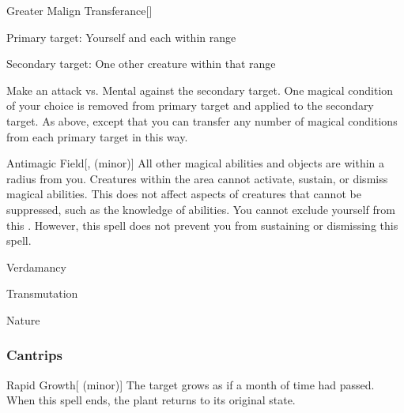 \lowercase{\hypertarget{spell:Greater Malign Transferance}{}}\label{spell:Greater Malign Transferance}
\begin{freeability}[Rank 6]{\hypertarget{spell:Greater Malign Transferance}{Greater Malign Transferance}}[]

Primary target: Yourself and each  within \rngmed range
\par\noindent
Secondary target: One other creature within that range

Make an attack vs. Mental against the secondary target.
\hit One magical condition of your choice is removed from primary target and applied to the secondary target.
\crit As above, except that you can transfer any number of magical conditions from each primary target in this way.
\end{freeability}
\vspace{0.25em}



\lowercase{\hypertarget{spell:Antimagic Field}{}}\label{spell:Antimagic Field}
\begin{freeability}[Rank 8]{\hypertarget{spell:Antimagic Field}{Antimagic Field}}[,  (minor)]
All other magical abilities and objects are  within a \areamed radius  from you.
Creatures within the area cannot activate, sustain, or dismiss magical abilities.
This does not affect aspects of creatures that cannot be suppressed, such as the knowledge of abilities.
You cannot exclude yourself from this .
However, this spell does not prevent you from sustaining or dismissing this spell.
\end{freeability}
\vspace{0.25em}


\newpage
\begin{spellsection}{Verdamancy}

\begin{spellheader}
\end{spellheader}


 Transmutation

 Nature

\subsubsection{Cantrips}


\begin{freeability}{Rapid Growth}[ (minor)]
The target grows as if a month of time had passed.
When this spell ends, the plant returns to its original state.
\end{freeability}

\end{spellsection}


